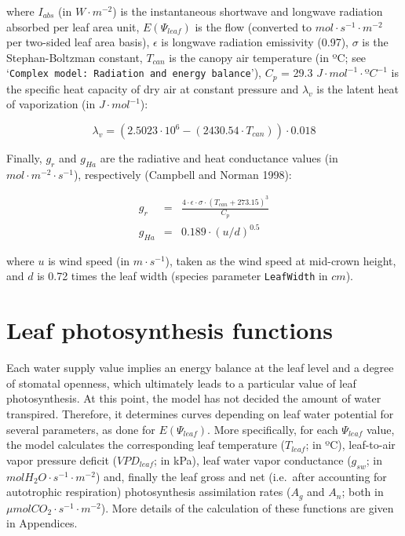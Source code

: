 \documentclass[]{book}
\begin{document}
where \(I_{abs}\) (in \(W \cdot m^{-2}\)) is the instantaneous shortwave
and longwave radiation absorbed per leaf area unit, \(E(\Psi_{leaf})\)
is the flow (converted to \(mol \cdot s^{-1} \cdot m^{-2}\) per
two-sided leaf area basis), \(\epsilon\) is longwave radiation
emissivity (0.97), \(\sigma\) is the Stephan-Boltzman constant,
\(T_{can}\) is the canopy air temperature (in ºC; see
`\texttt{Complex model: Radiation and energy balance}'), \(C_p\) = 29.3
\(J \cdot mol^{-1}\cdot ºC^{-1}\) is the specific heat capacity of dry
air at constant pressure and \(\lambda_v\) is the latent heat of
vaporization (in \(J \cdot mol^{-1}\)):

\begin{equation}
\lambda_v = (2.5023\cdot 10^6-(2430.54\cdot T_{can}))\cdot 0.018
\end{equation}

Finally, \(g_r\) and \(g_{Ha}\) are the radiative and heat conductance
values (in \(mol·m^{-2}·s^{-1}\)), respectively (Campbell and Norman
1998):

\begin{eqnarray}
g_r &=& \frac{4\cdot \epsilon \cdot \sigma \cdot (T_{can}+273.15)^3}{C_p} \\
g_{Ha} &=& 0.189 \cdot (u/d)^{0.5}
\end{eqnarray}

where \(u\) is wind speed (in \(m·s^{-1}\)), taken as the wind speed at
mid-crown height, and \(d\) is 0.72 times the leaf width (species
parameter \texttt{LeafWidth} in \(cm\)).

\section{Leaf photosynthesis
functions}\label{leaf-photosynthesis-functions}

Each water supply value implies an energy balance at the leaf level and
a degree of stomatal openness, which ultimately leads to a particular
value of leaf photosynthesis. At this point, the model has not decided
the amount of water transpired. Therefore, it determines curves
depending on leaf water potential for several parameters, as done for
\(E(\Psi_{leaf})\). More specifically, for each \(\Psi_{leaf}\) value,
the model calculates the corresponding leaf temperature (\(T_{leaf}\);
in ºC), leaf-to-air vapor pressure deficit (\(VPD_{leaf}\); in kPa),
leaf water vapor conductance (\(g_{sw}\); in \(mol H_2O·s^{-1}·m^{-2}\))
and, finally the leaf gross and net (i.e.~after accounting for
autotrophic respiration) photosynthesis assimilation rates (\(A_g\) and
\(A_n\); both in \(\mu mol CO_2·s^{-1}·m^{-2}\)). More details of the
calculation of these functions are given in Appendices.
\end{document}

